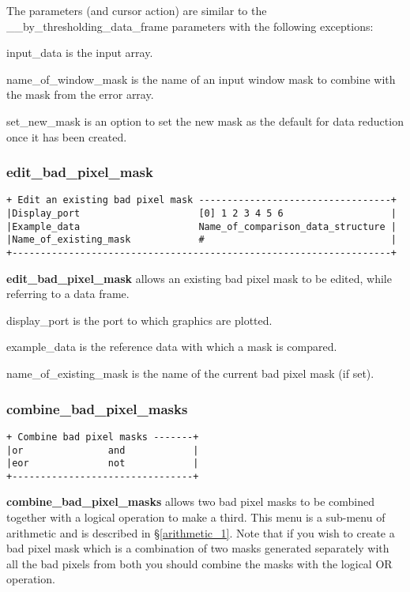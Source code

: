 {The parameters (and cursor action) are similar to the 
{\sf \_\_by\_thresholding\_data\_frame} parameters with the following 
exceptions:

{\sf input\_data} is the input array.

{\sf name\_of\_window\_mask} is the name of an input window mask to combine
with the mask from the error array.

{\sf set\_new\_mask} is an option to set the new mask as the default
for data reduction once it has been created.

\subsubsection{edit\_bad\_pixel\_mask}
\begin{verbatim}
+ Edit an existing bad pixel mask ----------------------------------+
|Display_port                     [0] 1 2 3 4 5 6                   |
|Example_data                     Name_of_comparison_data_structure |
|Name_of_existing_mask            #                                 |
+-------------------------------------------------------------------+
\end{verbatim}

{\bf edit\_bad\_pixel\_mask} allows an existing bad pixel mask to be 
edited, while referring to a data frame. 

{\sf display\_port} is the port to which graphics are plotted.

{\sf example\_data} is the reference data with which a mask is compared.

{\sf name\_of\_existing\_mask} is the name of the current bad pixel mask 
(if set).

\subsubsection{combine\_bad\_pixel\_masks}
\begin{verbatim}
+ Combine bad pixel masks -------+
|or               and            |
|eor              not            |
+--------------------------------+
\end{verbatim}

{\bf combine\_bad\_pixel\_masks} allows two bad pixel masks to be 
combined together with a logical operation to make a third. This menu
is a sub-menu of {\sf arithmetic} and is described in \S \ref{arithmetic_1}.
Note that if you wish to create a bad pixel mask which is a combination of
two masks generated separately with all the bad pixels from both you should
combine the masks with the logical {\sf OR} operation.

}
